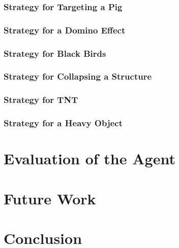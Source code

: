 \documentclass[a4paper, pdftex, ngerman]{article}
\begin{document}
\subsubsection{Strategy for Targeting a Pig}


\subsubsection{Strategy for a Domino Effect}


\subsubsection{Strategy for Black Birds}


\subsubsection{Strategy for Collapsing a Structure}


\subsubsection{Strategy for TNT}


\subsubsection{Strategy for a Heavy Object}


\newpage
\section{Evaluation of the Agent}
\label{sec:eval}


\newpage
\section{Future Work}


\newpage
\section{Conclusion}


\newpage


\end{document}
